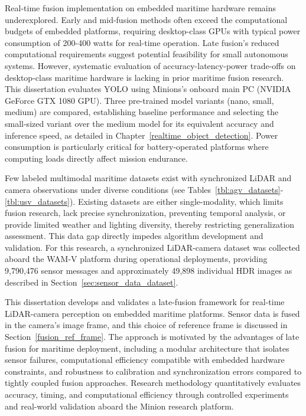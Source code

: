 \documentclass{erauthesis}
\begin{document}
Real-time fusion implementation on embedded maritime hardware remains underexplored.
Early and mid-fusion methods often exceed the computational budgets of embedded platforms, requiring desktop-class GPUs with typical power consumption of 200-400 watts for real-time operation.
Late fusion's reduced computational requirements suggest potential feasibility for small autonomous systems.
However, systematic evaluation of accuracy-latency-power trade-offs on desktop-class maritime hardware is lacking in prior maritime fusion research.
This dissertation evaluates YOLO using Minions's onboard main PC (NVIDIA GeForce GTX 1080 GPU). Three pre-trained model variants (nano, small, medium) are compared, establishing baseline performance and selecting the small-sized variant over the medium model for its equivalent accuracy and inference speed, as detailed in Chapter~\ref{realtime_object_detection}.
Power consumption is particularly critical for battery-operated platforms where computing loads directly affect mission endurance.

Few labeled multimodal maritime datasets exist with synchronized \ac{LiDAR} and camera observations under diverse conditions \cite{huang2025} (see Tables~\ref{tbl:agv_datasets}-\ref{tbl:usv_datasets}).
Existing datasets are either single-modality, which limits fusion research, lack precise synchronization, preventing temporal analysis, or provide limited weather and lighting diversity, thereby restricting generalization assessment.
This data gap directly impedes algorithm development and validation.
For this research, a synchronized \ac{LiDAR}-camera dataset was collected aboard the \acl{WAM-V} platform during operational deployments, providing 9,790,476 sensor messages and approximately 49,898 individual HDR images as described in Section~\ref{sec:sensor_data_dataset}.

This dissertation develops and validates a late-fusion framework for real-time \ac{LiDAR}-camera perception on embedded maritime platforms.
Sensor data is fused in the camera's image frame, and this choice of reference frame is discussed in Section~\ref{fusion_ref_frame}.
The approach is motivated by the advantages of late fusion for maritime deployment, including a modular architecture that isolates sensor failures, computational efficiency compatible with embedded hardware constraints, and robustness to calibration and synchronization errors compared to tightly coupled fusion approaches.
Research methodology quantitatively evaluates accuracy, timing, and computational efficiency through controlled experiments and real-world validation aboard the Minion research platform.
\end{document}
